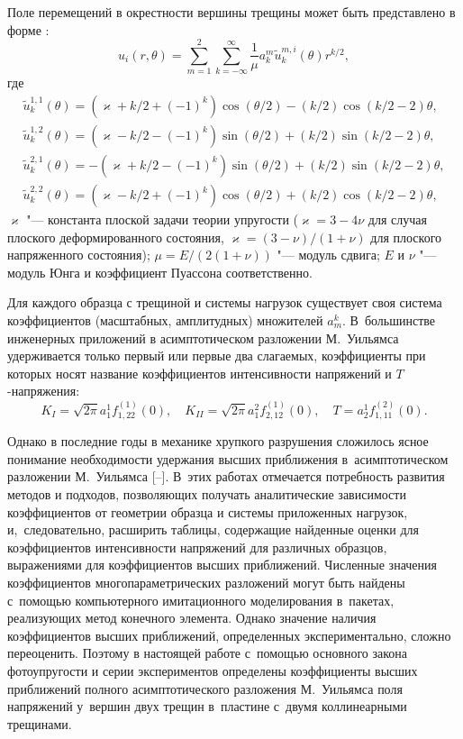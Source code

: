 Поле перемещений в окрестности вершины трещины может быть представлено в форме \cite{Karihaloo2011, Karihaloo2003}:
$$
u_i(r,\theta) =\sum_{m=1}^{2}\sum_{k=-\infty}^{\infty}\frac{1}{\mu}a_k^m\tilde u_k^{m,i}(\theta )r^{k/2},
$$
где 
\begin{equation}
\label{dis}
\begin{array}{l}
\tilde u_k^{1,1}(\theta)= (\varkappa +k/2+(-1)^k)\cos (\theta /2)-(k/2)\cos(k/2-2)\theta ,\\[2mm]
\tilde u_k^{1,2}(\theta)=  (\varkappa -k/2-(-1)^k)\sin (\theta /2)+(k/2)\sin(k/2-2)\theta ,\\[2mm]
\tilde u_k^{2,1}(\theta)= -(\varkappa +k/2-(-1)^k)\sin (\theta /2)+(k/2)\sin(k/2-2)\theta ,\\[2mm]
\tilde u_k^{2,2}(\theta)=  (\varkappa -k/2+(-1)^k)\cos (\theta /2)+(k/2)\cos(k/2-2)\theta ,
\end{array}
\end{equation}
 $\varkappa$ "--- константа плоской задачи теории упругости ($\varkappa=3-4\nu$ для случая плоского деформированного состояния, $\varkappa =(3-\nu )/(1+\nu)$ для плоского напряженного состояния); 
 $\mu= E/(2(1+\nu))$  "--- модуль сдвига; $E$ и $\nu$ "--- модуль Юнга и коэффициент Пуассона соответственно.

Для каждого образца с трещиной и системы нагрузок существует своя система коэффициентов (масштабных, амплитудных) множителей $a^k_m.$ 
В~большинстве инженерных приложений в асимптотическом разложении М.~Уильямса удерживается только первый или первые два слагаемых, коэффициенты при которых носят название коэффициентов интенсивности напряжений и $T$-напряжения:
$$
K_I=\sqrt{2\pi}a_1^1f^{(1)}_{1,22}(0),\quad
 K_{II}=\sqrt{2\pi}a_1^2f^{(1)}_{2,12}(0),\quad T=a_2^1f^{(2)}_{1,11}(0).
$$

Однако в последние годы в механике хрупкого разрушения сложилось ясное понимание необходимости удержания высших приближения в~асимптотическом разложении М.~Уильямса [--]. 
В~этих работах отмечается  потребность развития методов и подходов, позволяющих получать аналитические зависимости коэффициентов от геометрии образца и системы приложенных нагрузок, и,~следовательно, расширить таблицы, содержащие найденные оценки для коэффициентов интенсивности напряжений для различных образцов, выражениями для коэффициентов высших приближений. Численные значения коэффициентов многопараметрических разложений могут быть найдены с~помощью компьютерного имитационного моделирования в~пакетах, реализующих метод конечного элемента. 
Однако значение наличия коэффициентов высших приближений, определенных экспериментально, сложно переоценить. 
Поэтому в настоящей работе с~помощью основного закона фотоупругости
и серии экспериментов определены коэффициенты высших приближений полного асимптотического разложения М.~Уильямса поля напряжений у~вершин двух трещин в~пластине с~двумя коллинеарными трещинами.

